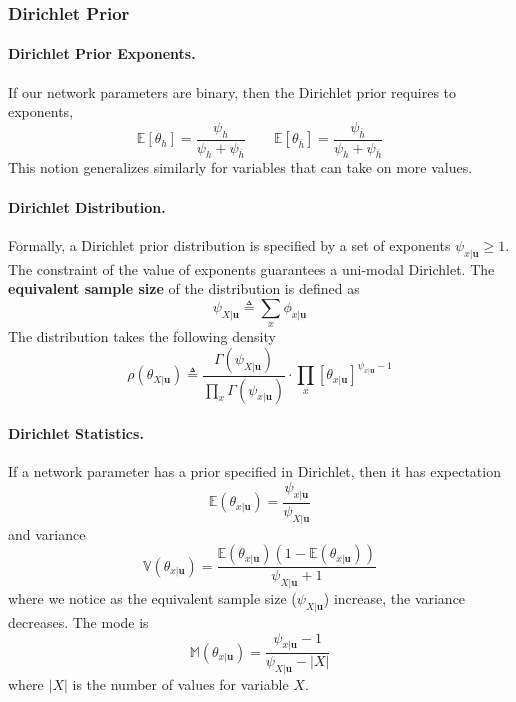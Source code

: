 \documentclass[11pt]{article}
\newcommand{\bu}{\mathbf{u}}
\begin{document}
\subsubsection{Dirichlet Prior}
\paragraph{Dirichlet Prior Exponents.}
If our network parameters are binary, then the Dirichlet prior requires to exponents, 
\begin{equation}
	\mathbb E [ \theta_h ] = \frac{\psi_h}{\psi_h + \psi_{\overbar h}} \quad \quad 
	\mathbb E [ \theta_{\overbar h} ] = \frac{\psi_{\overbar h}}{\psi_h + \psi_{\overbar h}}
\end{equation}
This notion generalizes similarly for variables that can take on more values. 

\paragraph{Dirichlet Distribution.} Formally, a Dirichlet prior distribution is specified by a set of exponents $\psi_{x | \bu} \geq 1$. The constraint of the value of exponents guarantees a uni-modal Dirichlet. The \textbf{equivalent sample size} of the distribution is defined as 
\begin{equation}
	\psi_{X | \bu}  \triangleq \sum_ x \phi_{x | \bu}
\end{equation}
The distribution takes the following density
\begin{equation}
	\rho ( \theta _ { X | \bu } ) \triangleq \frac{\Gamma (\psi _ {X | \bu} )}{\prod _ x \Gamma (\psi _ {x | \bu}) } \cdot  \prod_x \left[ \theta _ {x | \bu} \right] ^{\psi_{x | \bu} - 1}
\end{equation}

\paragraph{Dirichlet Statistics.}
If a network parameter has a prior specified in Dirichlet, then it has expectation
\begin{equation}
	\mathbb E ( \theta _{x | \bu} ) = \frac{\psi _ {x | \bu}}{\psi _ {X | \bu}}
\end{equation}
and variance 
\begin{equation}
	\mathbb V (\theta _{x | \bu} ) = \frac{\mathbb E ( \theta _{x | \bu} ) ( 1- \mathbb E ( \theta _{x | \bu} ))}{\psi_{X | \bu } + 1}
\end{equation}
where we notice as the equivalent sample size ($\psi_{X | \bu }$) increase, the variance decreases. The mode is 
\begin{equation}
	\mathbb M ( \theta _{x | \bu} ) = \frac{\psi_{x | \bu} - 1}{\psi _{X | \bu} - |X|}
\end{equation}
where $|X|$ is the number of values for variable $X$. 
\end{document}

